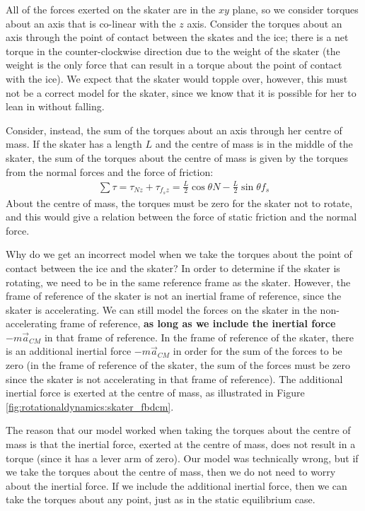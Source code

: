 All of the forces exerted on the skater are in the $xy$ plane, so we consider torques about an axis that is co-linear with the $z$ axis. Consider the torques about an axis through the point of contact between the skates and the ice; there is a net torque in the counter-clockwise direction due to the weight of the skater (the weight is the only force that can result in a torque about the point of contact with the ice). We expect that the skater would topple over, however, this must not be a correct model for the skater, since we know that it is possible for her to lean in without falling. 

Consider, instead, the sum of the torques about an axis through her centre of mass. If the skater has a length $L$ and the centre of mass is in the middle of the skater, the sum of the torques about the centre of mass is given by the torques from the normal forces and the force of friction:
\begin{align*}
\sum \tau = \tau_{Nz} + \tau_{f_sz} = \frac{L}{2}\cos\theta N - \frac{L}{2}\sin\theta f_s
\end{align*}
About the centre of mass, the torques must be zero for the skater not to rotate, and this would give a relation between the force of static friction and the normal force.

Why do we get an incorrect model when we take the torques about the point of contact between the ice and the skater? In order to determine if the skater is rotating, we need to be in the same reference frame as the skater. However, the frame of reference of the skater is not an inertial frame of reference, since the skater is accelerating. We can still model the forces on the skater in the non-accelerating frame of reference, \textbf{as long as we include the inertial force $-m\vec a_{CM}$} in that frame of reference. In the frame of reference of the skater, there is an additional inertial force $-m\vec a_{CM}$ in order for the sum of the forces to be zero (in the frame of reference of the skater, the sum of the forces must be zero since the skater is not accelerating in that frame of reference). The additional inertial force is exerted at the centre of mass, as illustrated in Figure \ref{fig:rotationaldynamics:skater_fbdcm}.

The reason that our model worked when taking the torques about the centre of mass is that the inertial force, exerted at the centre of mass, does not result in a torque (since it has a lever arm of zero). Our model was technically wrong, but if we take the torques about the centre of mass, then we do not need to worry about the inertial force. If we include the additional inertial force, then we can take the torques about any point, just as in the static equilibrium case.

